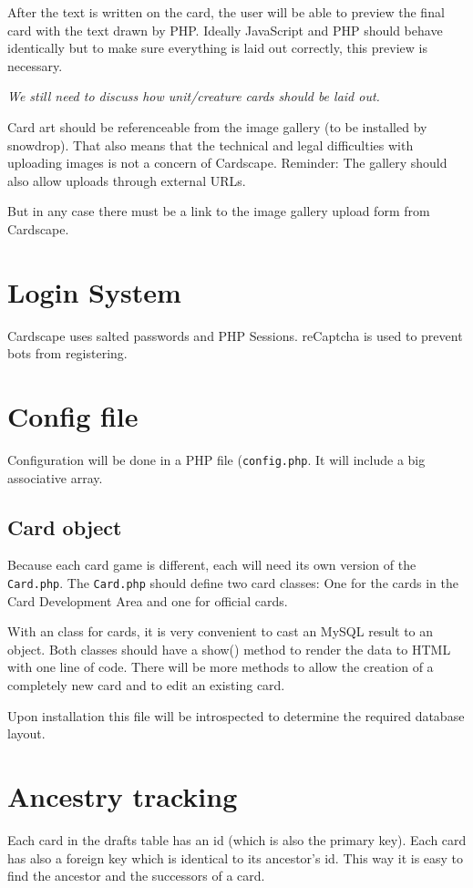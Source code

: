 \documentclass[a4paper, 11pt]{scrbook}
\begin{document}
After the text is written on the card, the user will be able to preview the final card with the text drawn by PHP. Ideally JavaScript and PHP should behave identically but to make sure everything is laid out correctly, this preview is necessary.

\emph{We still need to discuss how unit/creature cards should be laid out.}

Card art should be referenceable from the image gallery (to be installed by snowdrop). That also means that the technical and legal difficulties with uploading images is not a concern of Cardscape. Reminder: The gallery should also allow uploads through external URLs.

But in any case there must be a link to the image gallery upload form from Cardscape.

\section{Login System}
Cardscape uses salted passwords and PHP Sessions. reCaptcha is used to prevent bots from registering.

\section{Config file}
Configuration will be done in a PHP file (\texttt{config.php}. It will include a big associative array.

\subsection{Card object}
Because each card game is different, each will need its own version of the \texttt{Card.php}. The \texttt{Card.php} should define two card classes: One for the cards in the Card Development Area and one for official cards.

With an class for cards, it is very convenient to cast an MySQL result to an object. Both classes should have a show() method to render the data to HTML with one line of code. There will be more methods to allow the creation of a completely new card and to edit an existing card.

Upon installation this file will be introspected to determine the required database layout.

\section{Ancestry tracking}
Each card in the drafts table has an id (which is also the primary key). Each card has also a foreign key which is identical to its ancestor's id. This way it is easy to find the ancestor and the successors of a card.
\end{document}
